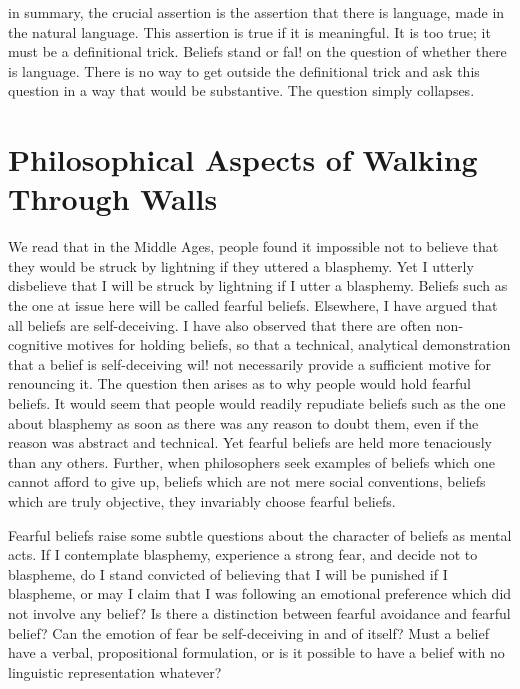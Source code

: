 \documentclass[10pt,twoside,draft]{memoir}
\begin{document}
in summary, the crucial assertion is the assertion that there is language, 
made in the natural language. This assertion is true if it is meaningful. It is 
too true; it must be a definitional trick. Beliefs stand or fal! on the question 
of whether there is language. There is no way to get outside the definitional 
trick and ask this question in a way that would be substantive. The question 
simply collapses. 

\chapter{Philosophical Aspects of Walking Through Walls}


We read that in the Middle Ages, people found it impossible not to 
believe that they would be struck by lightning if they uttered a blasphemy. 
Yet I utterly disbelieve that I will be struck by lightning if I utter a 
blasphemy. Beliefs such as the one at issue here will be called fearful beliefs. 
Elsewhere, I have argued that all beliefs are self-deceiving. I have also 
observed that there are often non-cognitive motives for holding beliefs, so 
that a technical, analytical demonstration that a belief is self-deceiving wil! 
not necessarily provide a sufficient motive for renouncing it. The question 
then arises as to why people would hold fearful beliefs. It would seem that 
people would readily repudiate beliefs such as the one about blasphemy as 
soon as there was any reason to doubt them, even if the reason was abstract 
and technical. Yet fearful beliefs are held more tenaciously than any others. 
Further, when philosophers seek examples of beliefs which one cannot 
afford to give up, beliefs which are not mere social conventions, beliefs 
which are truly objective, they invariably choose fearful beliefs. 

Fearful beliefs raise some subtle questions about the character of beliefs 
as mental acts. If I contemplate blasphemy, experience a strong fear, and 
decide not to blaspheme, do I stand convicted of believing that I will be 
punished if I blaspheme, or may I claim that I was following an emotional 
preference which did not involve any belief? Is there a distinction between 
fearful avoidance and fearful belief? Can the emotion of fear be 
self-deceiving in and of itself? Must a belief have a verbal, propositional 
formulation, or is it possible to have a belief with no linguistic representation 
whatever? 
\end{document}

